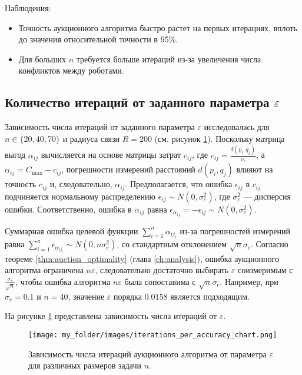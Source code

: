 Наблюдения:
\begin{itemize}
    \item Точность аукционного алгоритма быстро растет на первых итерациях, вплоть до значения относительной точности в 95\%.
    \item Для больших \( n \) требуется больше итераций из-за увеличения числа конфликтов между роботами.
\end{itemize}

\subsection{Количество итераций от заданного параметра \( \varepsilon \)}
\label{sec:iterations_per_epsilon}

Зависимость числа итераций от заданного параметра \( \varepsilon \) исследовалась для \( n \in \{20, 40, 70\} \) и радиуса связи \( R = 200 \) (см. рисунок \ref{fig:iterations_per_acc_chart}). Поскольку матрица выгод \( \alpha_{ij} \) вычисляется на основе матрицы затрат \( c_{ij} \), где \( c_{ij} = \frac{d(p_i, q_j)}{v_i} \), а \( \alpha_{ij} = C_{\text{max}} - c_{ij} \), погрешности измерений расстояний \( d(p_i, q_j) \) влияют на точность \( c_{ij} \) и, следовательно, \( \alpha_{ij} \). Предполагается, что ошибка \( \epsilon_{ij} \) в \( c_{ij} \) подчиняется нормальному распределению \( \epsilon_{ij} \sim N(0, \sigma_c^2) \), где \( \sigma_c^2 \) --- дисперсия ошибки. Соответственно, ошибка в \( \alpha_{ij} \) равна \( \epsilon_{\alpha_{ij}} = -\epsilon_{ij} \sim N(0, \sigma_c^2) \).

Суммарная ошибка целевой функции \( \sum_{i=1}^n \alpha_{i j_i} \) из-за погрешностей измерений равна \( \sum_{i=1}^n \epsilon_{\alpha_{i j_i}} \sim N(0, n \sigma_c^2) \), со стандартным отклонением \( \sqrt{n} \sigma_c \). Согласно теореме \ref{thm:auction_optimality} (глава \ref{ch:analysis}), ошибка аукционного алгоритма ограничена \( n \varepsilon \), следовательно достаточно выбирать \( \varepsilon \) соизмеримым с \( \frac{\sigma_c}{\sqrt{n}} \), чтобы ошибка алгоритма \( n \varepsilon \) была сопоставима с \( \sqrt{n} \sigma_c \). Например, при \( \sigma_c = 0.1 \) и \( n = 40 \), значение \( \varepsilon \) порядка \( 0.0158 \) является подходящим.

 На рисунке \ref{fig:iterations_per_acc_chart} представлена зависимость числа итераций от \( \varepsilon \).

\begin{figure}[h]
    \centering
    \texttt{[image: my\_folder/images/iterations\_per\_accuracy\_chart.png]}
    \caption{Зависимость числа итераций аукционного алгоритма от параметра \( \varepsilon \) для различных размеров задачи \( n \).}
    \label{fig:iterations_per_acc_chart}
\end{figure}

